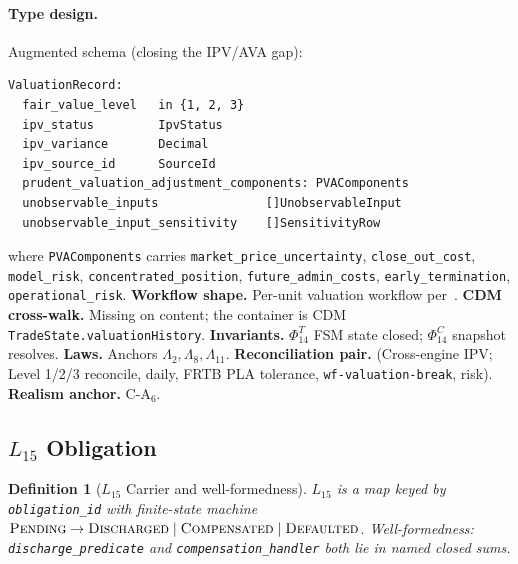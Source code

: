 \documentclass[11pt,a4paper]{article}
\newtheorem{definition}{Definition}[section]
\begin{document}
\paragraph{Type design.} Augmented schema (closing the IPV/AVA gap):
\begin{lstlisting}
ValuationRecord:
  fair_value_level   in {1, 2, 3}
  ipv_status         IpvStatus
  ipv_variance       Decimal
  ipv_source_id      SourceId
  prudent_valuation_adjustment_components: PVAComponents
  unobservable_inputs               []UnobservableInput
  unobservable_input_sensitivity    []SensitivityRow
\end{lstlisting}
where \texttt{PVAComponents} carries \texttt{market\_price\_uncertainty}, \texttt{close\_out\_cost}, \texttt{model\_risk}, \texttt{concentrated\_position}, \texttt{future\_admin\_costs}, \texttt{early\_termination}, \texttt{operational\_risk}. \textbf{Workflow shape.} Per-unit valuation workflow per~\cite[\S6]{valuation}. \textbf{CDM cross-walk.} Missing on content; the container is CDM \texttt{TradeState.valuationHistory}. \textbf{Invariants.} $\Phi_{14}^T$ FSM state closed; $\Phi_{14}^C$ snapshot resolves. \textbf{Laws.} Anchors $\Lambda_2, \Lambda_8, \Lambda_{11}$. \textbf{Reconciliation pair.} (Cross-engine IPV; Level 1/2/3 reconcile, daily, FRTB PLA tolerance, \texttt{wf-valuation-break}, risk). \textbf{Realism anchor.} $\mathrm{C\textrm{-}A}_6$.

\subsection{$L_{15}$ Obligation}
\label{sec:leaf-l15}

\begin{definition}[$L_{15}$ Carrier and well-formedness]
$L_{15}$ is a map keyed by \texttt{obligation\_id} with finite-state machine $\textsc{Pending} \to \textsc{Discharged} \mid \textsc{Compensated} \mid \textsc{Defaulted}$. Well-formedness: \texttt{discharge\_predicate} and \texttt{compensation\_handler} both lie in named closed sums.
\end{definition}
\end{document}
